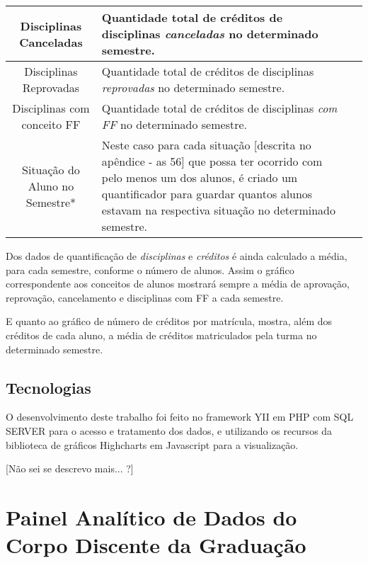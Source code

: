 \documentclass[cic,tc]{iiufrgs}
\begin{document}
\begin{longtable}[c]{|c|p{10cm}|p{2cm}|}
        Disciplinas Canceladas &   
        Quantidade total de créditos de disciplinas \textit{canceladas} no determinado semestre. \\ \hline
        
        Disciplinas Reprovadas &   
        Quantidade total de créditos de disciplinas \textit{reprovadas} no determinado semestre. \\ \hline
        
        Disciplinas com conceito FF &   
        Quantidade total de créditos de disciplinas \textit{com FF} no determinado semestre. \\ \hline
        
        Situação do Aluno no Semestre* &
        Neste caso para cada situação [descrita no apêndice - as 56] que possa ter ocorrido com pelo menos um dos alunos, é criado um quantificador para guardar quantos alunos estavam na respectiva situação no determinado semestre. \\ \hline
        
        
        
\end{longtable}
   
   Dos dados de quantificação de \textit{disciplinas} e \textit{créditos} é ainda calculado a média, para cada semestre, conforme o número de alunos. Assim o gráfico correspondente aos conceitos de alunos mostrará sempre a média de aprovação, reprovação, cancelamento e disciplinas com FF a cada semestre. 
   
   E quanto ao gráfico de número de créditos por matrícula, mostra, além dos créditos de cada aluno, a média de créditos matriculados pela turma no determinado semestre.
 
\section{Tecnologias}
O desenvolvimento deste trabalho foi feito no framework YII em PHP com SQL SERVER para o acesso e tratamento dos dados, e utilizando os recursos da biblioteca de gráficos Highcharts em Javascript para a visualização.

[Não sei se descrevo mais... ?]



\chapter{Painel Analítico de Dados do Corpo Discente da Graduação}\label{cap_4_painel}
\end{document}

